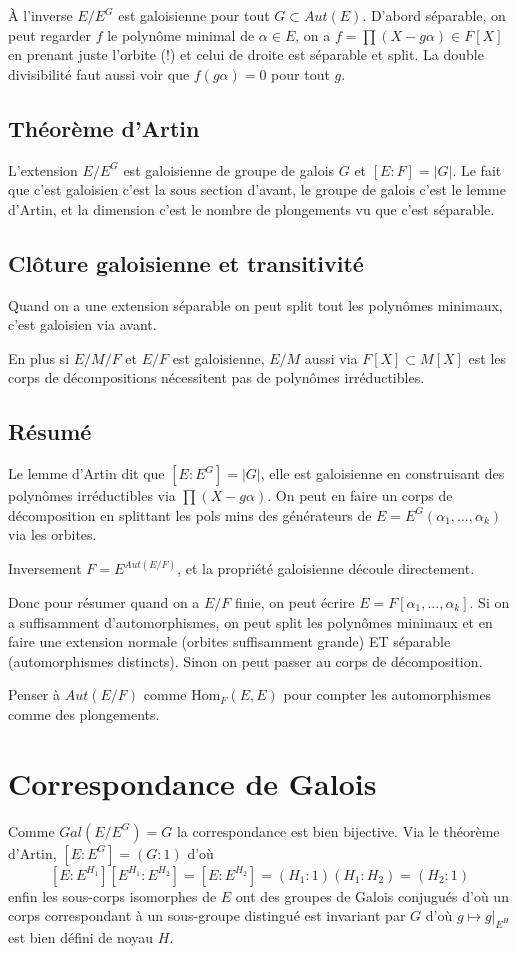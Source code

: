 \documentclass[a4paper,12pt]{book}
\newcommand{\Hom}{\textrm{Hom}}
\theoremstyle{plain}
\theoremstyle{definition}
\theoremstyle{remark}
\begin{document}
À l'inverse $E/E^G$ est galoisienne pour tout $G\subset Aut(E)$.
D'abord séparable, on peut regarder $f$ le polynôme minimal de 
$\alpha\in E$, on a $f=\prod(X-g\alpha)\in F[X]$ en prenant 
juste l'orbite (!) et celui de droite est séparable et split. 
La double divisibilité faut aussi voir que $f(g\alpha)=0$ pour
tout $g$.

\subsection{Théorème d'Artin}
L'extension $E/E^G$ est galoisienne de groupe de galois $G$
et $[E:F]=|G|$. Le fait que c'est galoisien c'est la sous section
d'avant, le groupe de galois c'est le lemme d'Artin, et la 
dimension c'est le nombre de plongements vu que c'est séparable.

\subsection{Clôture galoisienne et transitivité}
Quand on a une extension séparable on peut split tout les polynômes
minimaux, c'est galoisien via avant. 

En plus si $E/M/F$ et $E/F$ est galoisienne, $E/M$ aussi via
$F[X]\subset M[X]$ est les corps de décompositions nécessitent pas
de polynômes irréductibles.

\subsection{Résumé}
Le lemme d'Artin dit que $[E:E^G]=|G|$, elle est galoisienne
en construisant des polynômes irréductibles via $\prod(X-g\alpha)$.
On peut en faire un corps de décomposition en splittant les pols
mins des générateurs de $E=E^G(\alpha_1,\ldots,\alpha_k)$ via
les orbites.

Inversement $F=E^{Aut(E/F)}$, et la propriété galoisienne découle
directement. 

Donc pour résumer quand on a $E/F$ finie, on peut écrire 
$E=F[\alpha_1,\ldots,\alpha_k]$. Si on a suffisamment 
d'automorphismes, on peut split les polynômes minimaux et en faire
une extension normale (orbites suffisamment grande) ET séparable
(automorphismes distincts). Sinon on peut passer au corps de 
décomposition.

Penser à $Aut(E/F)$ comme $\Hom_F(E,E)$ pour compter les 
automorphismes comme des plongements. 

\section{Correspondance de Galois}
Comme $Gal(E/E^G)=G$ la correspondance est bien bijective. Via
le théorème d'Artin, $[E:E^G]=(G:1)$ d'où 
\[[E:E^{H_1}][E^{H_1}:E^{H_2}]=[E:E^{H_2}]=(H_1:1)(H_1:H_2)=(H_2:1)\]
enfin les sous-corps isomorphes de $E$ ont des groupes de Galois
conjugués d'où un corps correspondant à un sous-groupe distingué
est invariant par $G$ d'où $g\mapsto g|_{E^H}$ est bien défini
de noyau $H$.
\end{document}
